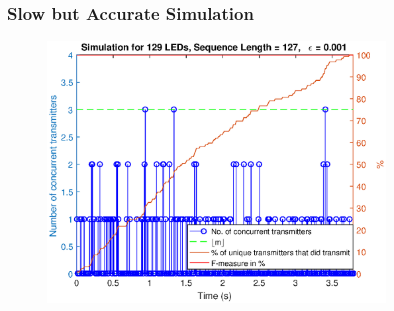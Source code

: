 \documentclass{beamer}
\begin{document}



	\begin{frame}\frametitle{Slow but Accurate Simulation}
		
		\begin{figure}
			\centering
			\includegraphics[width=0.8\textwidth]{../chapters/evaluation-chapters/simulation/sim-concurrent-tx-and-f-measure-eps=001-n=7}
		\end{figure}

	\end{frame}






\end{document}
